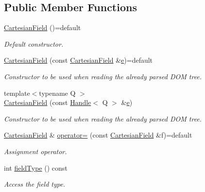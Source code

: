 \subsection*{Public Member Functions}
\begin{DoxyCompactItemize}
\item 
\hyperlink{class_d_d4hep_1_1_geometry_1_1_cartesian_field_a803638b0e867c43c21ffd0e9a595b966}{Cartesian\+Field} ()=default
\begin{DoxyCompactList}\small\item\em Default constructor. \end{DoxyCompactList}\item 
\hyperlink{class_d_d4hep_1_1_geometry_1_1_cartesian_field_a901fc6ea3e30b8cd3a275f71a5079393}{Cartesian\+Field} (const \hyperlink{class_d_d4hep_1_1_geometry_1_1_cartesian_field}{Cartesian\+Field} \&\hyperlink{_volumes_8cpp_a8a9a1f93e9b09afccaec215310e64142}{e})=default
\begin{DoxyCompactList}\small\item\em Constructor to be used when reading the already parsed D\+OM tree. \end{DoxyCompactList}\item 
{\footnotesize template$<$typename Q $>$ }\\\hyperlink{class_d_d4hep_1_1_geometry_1_1_cartesian_field_a3ed6cfe343f28a07d2a4ba5e19b1f0df}{Cartesian\+Field} (const \hyperlink{class_d_d4hep_1_1_handle}{Handle}$<$ Q $>$ \&\hyperlink{_volumes_8cpp_a8a9a1f93e9b09afccaec215310e64142}{e})
\begin{DoxyCompactList}\small\item\em Constructor to be used when reading the already parsed D\+OM tree. \end{DoxyCompactList}\item 
\hyperlink{class_d_d4hep_1_1_geometry_1_1_cartesian_field}{Cartesian\+Field} \& \hyperlink{class_d_d4hep_1_1_geometry_1_1_cartesian_field_a0e7da24116adf6f9028c01ffda0b90f9}{operator=} (const \hyperlink{class_d_d4hep_1_1_geometry_1_1_cartesian_field}{Cartesian\+Field} \&f)=default
\begin{DoxyCompactList}\small\item\em Assignment operator. \end{DoxyCompactList}\item 
int \hyperlink{class_d_d4hep_1_1_geometry_1_1_cartesian_field_a6cffcbff7ed03b336759830aeeedef40}{field\+Type} () const
\begin{DoxyCompactList}\small\item\em Access the field type. \end{DoxyCompactList}\item 

\end{DoxyCompactItemize}
